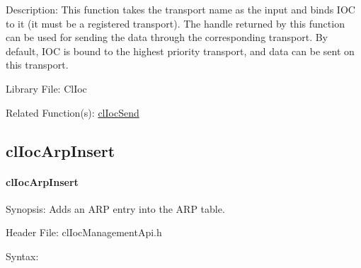 \begin{flushleft}
\begin{Desc}
\begin{description}
\end{description}
\end{Desc}
\begin{Desc}
\item[Description:] This function takes the transport name as the input and binds IOC to it (it must be a registered transport). The handle
returned by this function can be used for sending the data through the corresponding transport. By default, IOC is bound to the highest priority 
transport, and data can be sent on this transport.
\end{Desc}
\begin{Desc}
\item[Library File:]Cl\-Ioc\end{Desc}
\begin{Desc}
\item[Related Function(s):]\hyperlink{pageioc104}{clIocSend} \end{Desc}
\newpage


\subsection{clIocArpInsert}
\hypertarget{pageioc208}{}\paragraph{cl\-Ioc\-Arp\-Insert}\label{pageioc208}
\begin{Desc}
\item[Synopsis:]Adds an ARP entry into the ARP table.\end{Desc}
\begin{Desc}
\item[Header File:]clIocManagementApi.h\end{Desc}
\begin{Desc}
\item[Syntax:]


\end{Desc}
\end{flushleft}
